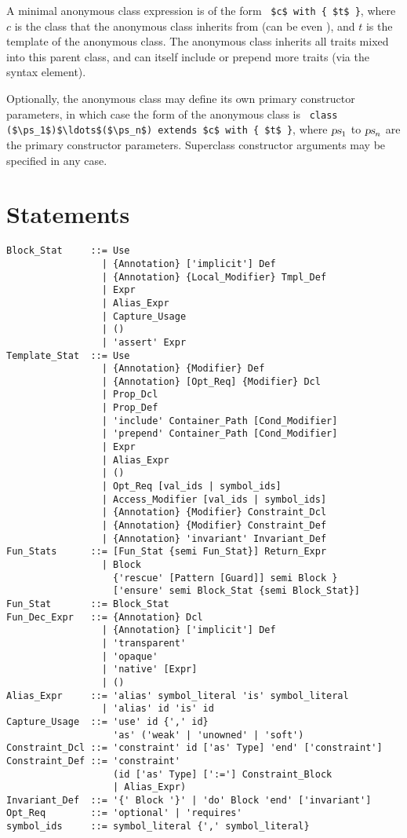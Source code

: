 A minimal anonymous class expression is of the form ~\lstinline!$c$ with { $t$ }!, where $c$ is the class that the anonymous class inherits from (can be even ), and $t$ is the template of the anonymous class. The anonymous class inherits all traits mixed into this parent class, and can itself include or prepend more traits (via the  syntax element). 

Optionally, the anonymous class may define its own primary constructor parameters, in which case the form of the anonymous class is ~\lstinline!class ($\ps_1$)$\ldots$($\ps_n$) extends $c$ with { $t$ }!, where $\mbox{\sl ps}_1$ to $\mbox{\sl ps}_n$ are the primary constructor parameters. Superclass constructor arguments may be specified in any case. 






\section{Statements}
\label{sec:statements}

\syntax\begin{lstlisting}
Block_Stat     ::= Use
                 | {Annotation} ['implicit'] Def
                 | {Annotation} {Local_Modifier} Tmpl_Def
                 | Expr
                 | Alias_Expr
                 | Capture_Usage
                 | ()
                 | 'assert' Expr
Template_Stat  ::= Use
                 | {Annotation} {Modifier} Def
                 | {Annotation} [Opt_Req] {Modifier} Dcl
                 | Prop_Dcl
                 | Prop_Def
                 | 'include' Container_Path [Cond_Modifier]
                 | 'prepend' Container_Path [Cond_Modifier]
                 | Expr
                 | Alias_Expr
                 | ()
                 | Opt_Req [val_ids | symbol_ids]
                 | Access_Modifier [val_ids | symbol_ids]
                 | {Annotation} {Modifier} Constraint_Dcl
                 | {Annotation} {Modifier} Constraint_Def
                 | {Annotation} 'invariant' Invariant_Def
Fun_Stats      ::= [Fun_Stat {semi Fun_Stat}] Return_Expr
                 | Block
                   {'rescue' [Pattern [Guard]] semi Block }
                   ['ensure' semi Block_Stat {semi Block_Stat}]
Fun_Stat       ::= Block_Stat
Fun_Dec_Expr   ::= {Annotation} Dcl
                 | {Annotation} ['implicit'] Def
                 | 'transparent'
                 | 'opaque'
                 | 'native' [Expr]
                 | ()
Alias_Expr     ::= 'alias' symbol_literal 'is' symbol_literal
                 | 'alias' id 'is' id
Capture_Usage  ::= 'use' id {',' id} 
                   'as' ('weak' | 'unowned' | 'soft')
Constraint_Dcl ::= 'constraint' id ['as' Type] 'end' ['constraint']
Constraint_Def ::= 'constraint' 
                   (id ['as' Type] [':='] Constraint_Block 
                   | Alias_Expr)
Invariant_Def  ::= '{' Block '}' | 'do' Block 'end' ['invariant']
Opt_Req        ::= 'optional' | 'requires'
symbol_ids     ::= symbol_literal {',' symbol_literal}
\end{lstlisting}

